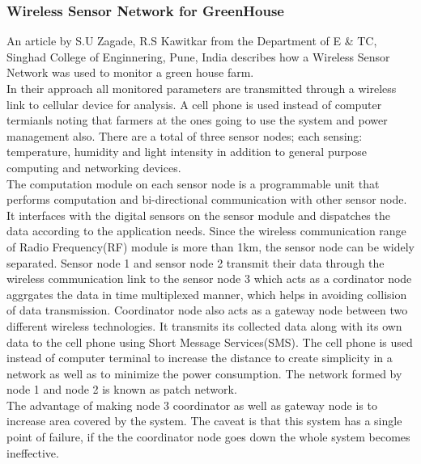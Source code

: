 \documentclass[12pt, a4paper]{article}
\begin{document}
\subsubsection{Wireless Sensor Network for GreenHouse}
An article by S.U Zagade, R.S Kawitkar from the Department of E \& TC, Singhad College of Enginnering, Pune, India describes how a Wireless Sensor Network was used to monitor a green house farm.\\
In their approach all monitored parameters are transmitted through a  wireless link to cellular device for analysis. A cell phone is used instead of computer termianls noting that farmers at the ones going to use the system and power management also. There are a total of three sensor nodes; each sensing: temperature, humidity and light intensity in addition to general purpose computing and networking devices.\\
The computation module on each sensor node is a programmable unit that performs computation and bi-directional communication with other sensor node. It interfaces with the digital sensors on the sensor module and dispatches the data according to the application needs. Since the wireless communication range of Radio Frequency(RF) module is more than 1km, the sensor node can be widely separated. Sensor node 1 and sensor node 2 transmit their data through the wireless communication link to the sensor node 3 which acts as a  cordinator node aggrgates the data in time multiplexed manner, which helps in avoiding collision of data transmission. Coordinator node also acts as a gateway node between two different wireless technologies. It transmits its collected data along with its own data to the cell phone using Short Message Services(SMS). The cell phone is used instead of computer terminal to increase the distance to create simplicity in a network as well as to minimize the power consumption. The network formed by node 1 and node 2 is known as patch network.\\
The advantage of making node 3 coordinator as well as gateway node is to increase area covered by the system. The caveat is that this system has a single point of failure, if the the coordinator node goes down the whole system becomes ineffective.  
\end{document}
